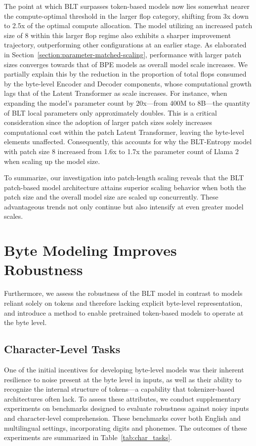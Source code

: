 The point at which {\textsc BLT} surpasses token-based models now lies somewhat nearer the compute-optimal threshold in the larger flop category, shifting from 3x down to 2.5x of the optimal compute allocation. The model utilizing an increased patch size of 8 within this larger flop regime also exhibits a sharper improvement trajectory, outperforming other configurations at an earlier stage. As elaborated in Section~\ref{section:parameter-matched-scaling}, performance with larger patch sizes converges towards that of BPE models as overall model scale increases. We partially explain this by the reduction in the proportion of total flops consumed by the byte-level Encoder and Decoder components, whose computational growth lags that of the Latent Transformer as scale increases. For instance, when expanding the model's parameter count by 20x—from 400M to 8B—the quantity of {\textsc BLT} local parameters only approximately doubles. This is a critical consideration since the adoption of larger patch sizes solely increases computational cost within the patch Latent Transformer, leaving the byte-level elements unaffected. Consequently, this accounts for why the {\textsc BLT}-Entropy model with patch size 8 increased from 1.6x to 1.7x the parameter count of Llama 2 when scaling up the model size.

To summarize, our investigation into patch-length scaling reveals that the {\textsc BLT} patch-based model architecture attains superior scaling behavior when both the patch size and the overall model size are scaled up concurrently. These advantageous trends not only continue but also intensify at even greater model scales.

\section{Byte Modeling Improves Robustness} Furthermore, we assess the robustness of the {\textsc BLT} model in contrast to models reliant solely on tokens and therefore lacking explicit byte-level representation, and introduce a method to enable pretrained token-based models to operate at the byte level.
\label{sec:robustness}

\subsection{Character-Level Tasks}

One of the initial incentives for developing byte-level models was their inherent resilience to noise present at the byte level in inputs, as well as their ability to recognize the internal structure of tokens—a capability that tokenizer-based architectures often lack. To assess these attributes, we conduct supplementary experiments on benchmarks designed to evaluate robustness against noisy inputs and character-level comprehension. These benchmarks cover both English and multilingual settings, incorporating digits and phonemes. The outcomes of these experiments are summarized in Table~\ref{tab:char_tasks}.

